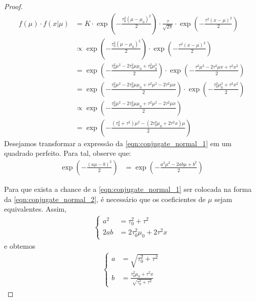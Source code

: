 \begin{proof}
 \begin{align}
  \label{eqn:conjugate_normal_1}
  f(\mu) \cdot f(x|\mu)
  &= K \cdot \exp\left(-\frac{\tau_{0}^{2}(\mu-\mu_{0})^{2}}{2}\right)
  \cdot \frac{\tau}{\sqrt{2\pi}} \cdot \exp\left(-\frac{\tau^{2}(x-\mu)^{2}}{2}\right) \nonumber \\
  &\propto \exp\left(-\frac{\tau_{0}^{2}(\mu-\mu_{0})^{2}}{2}\right) \cdot \exp\left(-\frac{\tau^{2}(x-\mu)^{2}}{2}\right)	\nonumber \\
  &= \exp\left(-\frac{\tau_{0}^{2}\mu^{2}-2\tau_{0}^{2}\mu\mu_{0}+\tau_{0}^{2}\mu_{0}^{2}}{2}\right) \cdot \exp\left(-\frac{\tau^{2}\mu^{2}-2\tau^{2}\mu x+ \tau^{2}x^{2}}{2}\right) \nonumber \\
  &= \exp\left(-\frac{\tau_{0}^{2}\mu^{2}-2\tau_{0}^{2}\mu\mu_{0}+\tau^{2}\mu^{2}-2\tau^{2}\mu x}{2}\right) \cdot \exp\left(-\frac{\tau_{0}^{2}\mu_{0}^{2}+\tau^{2}x^{2}}{2}\right) \nonumber \\
  &\propto \exp\left(-\frac{\tau_{0}^{2}\mu^{2}-2\tau_{0}^{2}\mu\mu_{0}+\tau^{2}\mu^{2}-2\tau^{2}\mu x}{2}\right) \nonumber \\
  &= \exp\left(-\frac{(\tau_{0}^{2}+\tau^{2})\mu^{2}-(2\tau_{0}^{2}\mu_{0}+2\tau^{2}x)\mu}{2}\right)
 \end{align}
 Desejamos transformar a expressão da
 \cref{eqn:conjugate_normal_1} em um quadrado perfeito.
 Para tal, observe que:
 \begin{align}
  \label{eqn:conjugate_normal_2}
  \exp\left(-\frac{(a\mu-b)^{2}}{2}\right)
  &= \exp\left(-\frac{a^{2}\mu^{2}-2ab\mu+b^{2}}{2}\right)
 \end{align}

 Para que exista a chance de a 
 \cref{eqn:conjugate_normal_1} ser colocada na
 forma da \cref{eqn:conjugate_normal_2},
 é necessário que os coeficientes de $\mu$ sejam
 equivalentes. Assim,
 \begin{align*}
  \begin{cases}
   a^{2} &= \tau_{0}^{2}+\tau^{2} \\
   2ab &= 2\tau_{0}^{2}\mu_{0}+2\tau^{2}x
  \end{cases}
 \end{align*}
 e obtemos
 \begin{align}
  \label{eqn:conjugate_normal_3}
  \begin{cases}
   a &= \sqrt{\tau_{0}^{2}+\tau^{2}} \\
   b &= \frac{\tau_{0}^{2}\mu_{0}+\tau^{2}x}
   {\sqrt{\tau_{0}^{2}+\tau^{2}}}
  \end{cases}
 \end{align}


\end{proof}
